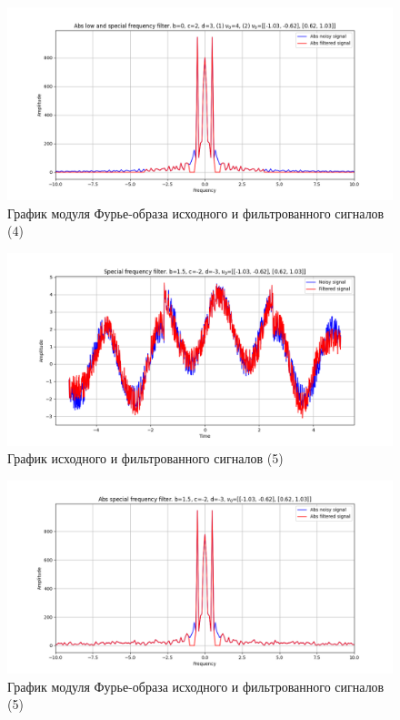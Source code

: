\documentclass[a4paper, 12pt]{article}
\begin{document}
    \begin{figure}[!htb]
        \centering
        \includegraphics[scale=0.48]{4_3_abs_u_U_nospec.png}
        \captionsetup{skip=0pt}
        \caption{График модуля Фурье-образа исходного и фильтрованного сигналов (4)}
        \label{fig:fig108}
    \end{figure}
    \begin{figure}[!htb]
        \centering
        \includegraphics[scale=0.48]{5_u_flt_u_nospec.png}
        \captionsetup{skip=0pt}
        \caption{График исходного и фильтрованного сигналов (5)}
        \label{fig:fig01}
    \end{figure}
    \begin{figure}[!htb]
        \centering
        \includegraphics[scale=0.48]{5_abs_u_U_nospec.png}
        \captionsetup{skip=0pt}
        \caption{График модуля Фурье-образа исходного и фильтрованного сигналов (5)}
        \label{fig:fig02}
    \end{figure}
\end{document}
